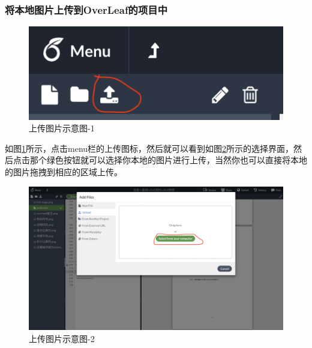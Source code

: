\documentclass{article}
\begin{document}
\subsubsection{将本地图片上传到OverLeaf的项目中}

 \begin{figure}[H]
\centering
\includegraphics[width=1\textwidth]{upload-pic.png}
\caption{上传图片示意图-1}
\label{upload-pic}
\end{figure}

如图\ref{upload-pic}所示，点击menu栏的上传图标，然后就可以看到如图\ref{select-pic}所示的选择界面，然后点击那个绿色按钮就可以选择你本地的图片进行上传，当然你也可以直接将本地的图片拖拽到相应的区域上传。

\begin{figure}[H]
\centering
\includegraphics[width=1\textwidth]{select-pic.png}
\caption{上传图片示意图-2}
\label{select-pic}
\end{figure}
\end{document}
